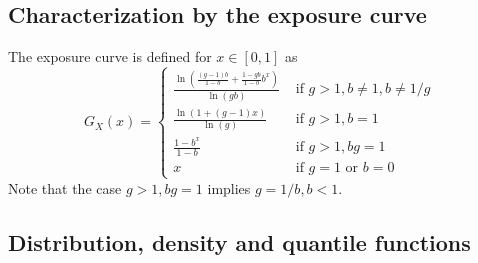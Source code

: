 \documentclass[article, nojss]{jss}
\newcommand{\systL}{\left\{\begin{array}{ll}}
\newcommand{\systR}{\end{array}\right.}
\begin{document}
\subsection{Characterization by the exposure curve}

The exposure curve is defined for $x\in[0,1]$ as
\begin{equation}
G_X(x)=
\systL
\frac{\ln(\frac{(g-1)b}{1-b}+\frac{1-gb}{1-b}b^x)}{\ln(gb)} & \text{ if } g>1, b\neq 1, b\neq 1/g \\
\frac{\ln(1+(g-1)x)}{\ln( g)} & \text{ if } g>1, b= 1 \\
\frac{1-b^x}{1-b} & \text{ if } g>1, bg= 1 \\
x & \text{ if } g=1 \text{ or } b= 0
\systR
\label{expcurve:mbbefd:gb}
\end{equation}
Note that the case $g>1, bg=1$ implies $g=1/b, b<1$.


\subsection{Distribution, density and quantile functions}
\end{document}
